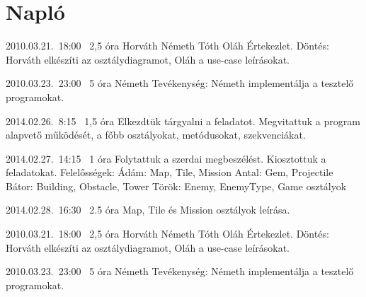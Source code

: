 %
\section{Napló}

\begin{naplo}

\bejegyzes
{2010.03.21.~18:00~} %
{2,5 óra} %
{Horváth\newline
Németh\newline
Tóth\newline
Oláh} %
{Értekezlet. Döntés: Horváth elkészíti az osztálydiagramot, Oláh a use-case leírásokat.} %

\bejegyzes
{2010.03.23.~23:00~}
{5 óra}
{Németh}
{Tevékenység: Németh implementálja a tesztelő programokat.}

\bejegyzes
{2014.02.26.~8:15~} %
{1,5 óra} %
{\vadam\newline
\vantal\newline
\vbator\newline
\vtorok}
{Elkezdtük tárgyalni a feladatot. Megvitattuk a program alapvető működését, a főbb osztályokat, metódusokat, szekvenciákat.}

\bejegyzes
{2014.02.27.~14:15~}
{1 óra}
{\vadam\newline
\vantal\newline
\vbator\newline
\vtorok}
{Folytattuk a szerdai megbeszélést. Kiosztottuk a feladatokat. \newline Felelősségek: \newline
Ádám: Map, Tile, Mission \newline
Antal: Gem, Projectile \newline
Bátor: Building, Obstacle, Tower \newline
Török: Enemy, EnemyType, Game \newline osztályok}

\bejegyzes
{2014.02.28.~16:30~}
{ 2.5 óra}
{\vadam}
{Map, Tile és Mission osztályok leírása.}

\bejegyzes
{2010.03.21.~18:00~} %
{2,5 óra} %
{Horváth\newline
Németh\newline
Tóth\newline
Oláh} %
{Értekezlet. Döntés: Horváth elkészíti az osztálydiagramot, Oláh a use-case leírásokat.} %

\bejegyzes
{2010.03.23.~23:00~}
{5 óra}
{Németh}
{Tevékenység: Németh implementálja a tesztelő programokat.}


\end{naplo}

